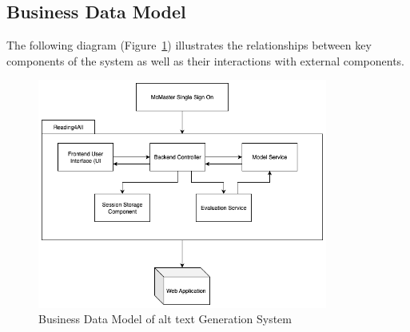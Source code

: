 \documentclass[12pt]{article}
\begin{document}
\subsection{Business Data Model}
The following diagram (Figure~\ref{fig:business_data_model}) illustrates the relationships between key components of the system as well as their interactions with external components.

\begin{figure}[h!]
    \centering
    \includegraphics[width=0.85\textwidth]{images/business-data-model.png}
    \caption{Business Data Model of alt text Generation System}
    \label{fig:business_data_model}
\end{figure}
\end{document}
